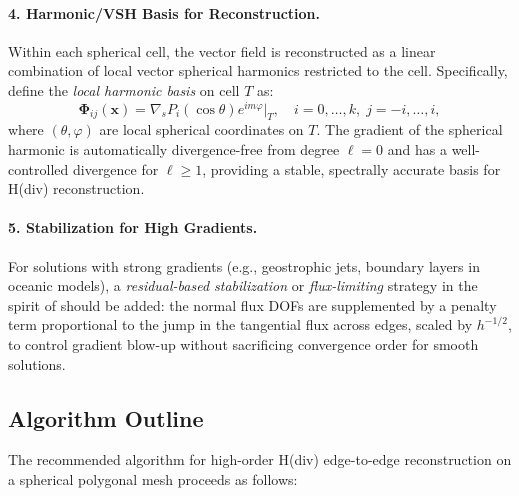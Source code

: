 \paragraph{4. Harmonic/VSH Basis for Reconstruction.}
Within each spherical cell, the vector field is reconstructed as a linear
combination of local vector spherical harmonics restricted to the cell.
Specifically, define the \emph{local harmonic basis} on cell $T$ as:
\[
  \boldsymbol{\Phi}_{ij}(\mathbf{x}) = \nabla_s P_i(\cos\theta)e^{im\varphi}
  \big|_T, \quad i = 0,\ldots,k,\; j = -i,\ldots,i,
\]
where $(\theta,\varphi)$ are local spherical coordinates on $T$.
The gradient of the spherical harmonic is automatically divergence-free
from degree $\ell=0$ and has a well-controlled divergence for $\ell\geq 1$,
providing a stable, spectrally accurate basis for H(div) reconstruction.

\paragraph{5. Stabilization for High Gradients.}
For solutions with strong gradients (e.g., geostrophic jets, boundary layers
in oceanic models), a \emph{residual-based stabilization} or
\emph{flux-limiting} strategy in the spirit of \cite{cockburnLDG1998} should
be added: the normal flux DOFs are supplemented by a penalty term proportional
to the jump in the tangential flux across edges, scaled by $h^{-1/2}$, to
control gradient blow-up without sacrificing convergence order for smooth
solutions.

\subsection{Algorithm Outline}

The recommended algorithm for high-order H(div) edge-to-edge reconstruction
on a spherical polygonal mesh proceeds as follows:

